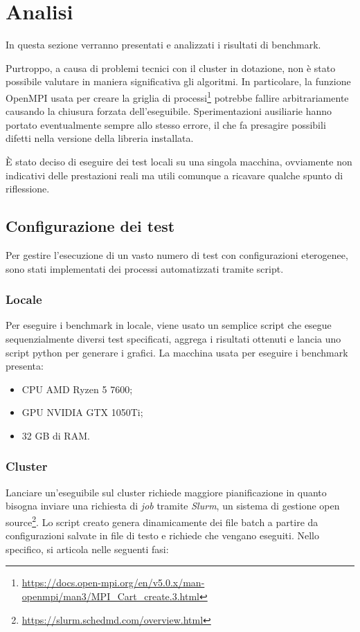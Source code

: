 \section{Analisi}

In questa sezione verranno presentati e analizzati i risultati di benchmark.

Purtroppo, a causa di problemi tecnici con il cluster in dotazione, non è stato possibile valutare in maniera significativa gli algoritmi. In particolare, la funzione OpenMPI usata per creare la griglia di processi\footnote{\url{https://docs.open-mpi.org/en/v5.0.x/man-openmpi/man3/MPI_Cart_create.3.html}} potrebbe fallire arbitrariamente causando la chiusura forzata dell'eseguibile. Sperimentazioni ausiliarie hanno portato eventualmente sempre allo stesso errore, il che fa presagire possibili difetti nella versione della libreria installata.

È stato deciso di eseguire dei test locali su una singola macchina, ovviamente non indicativi delle prestazioni reali ma utili comunque a ricavare qualche spunto di riflessione.

\subsection{Configurazione dei test}

Per gestire l'esecuzione di un vasto numero di test con configurazioni eterogenee, sono stati implementati dei processi automatizzati tramite script.

\subsubsection{Locale}
Per eseguire i benchmark in locale, viene usato un semplice script che esegue sequenzialmente diversi test specificati, aggrega i risultati ottenuti e lancia uno script python per generare i grafici.
La macchina usata per eseguire i benchmark presenta:
\begin{itemize}
    \item CPU AMD Ryzen 5 7600;
    \item GPU NVIDIA GTX 1050Ti;
    \item 32 GB di RAM.
\end{itemize}

\subsubsection{Cluster}
Lanciare un'eseguibile sul cluster richiede maggiore pianificazione in quanto bisogna inviare una richiesta di \textit{job} tramite \textit{Slurm}, un sistema di gestione open source\footnote{\url{https://slurm.schedmd.com/overview.html}}. Lo script creato genera dinamicamente dei file batch a partire da configurazioni salvate in file di testo e richiede che vengano eseguiti. Nello specifico, si articola nelle seguenti fasi:

